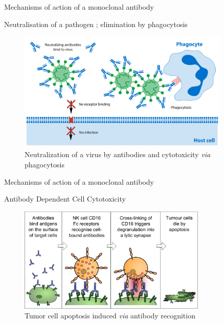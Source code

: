 \begin{frame}{Mechanisms of action of a monoclonal antibody}
    \begin{block}{Neutralisation of a pathogen ; elimination by phagocytosis}
        \begin{figure}
            \centering
            \includegraphics[width=0.9\textwidth]{../Images/antibodies_neutralization.jpeg}
            \caption{Neutralization of a virus by antibodies and cytotoxicity \emph{via} phagocytosis}
            \label{fig:neutralization_antibodies}
        \end{figure}
    \end{block}
\end{frame}

\begin{frame}{Mechanisms of action of a monoclonal antibody}
    \begin{block}{Antibody Dependent Cell Cytotoxicity}
        \begin{figure}
            \centering
            \includegraphics[width=0.8\textwidth]{../Images/Antibody-dependent_Cellular_Cytotoxicity.svg.png}
            \caption{Tumor cell apoptosis induced \emph{via} antibody recognition}
            \label{fig:ADCC}
        \end{figure}
    \end{block}
\end{frame}


